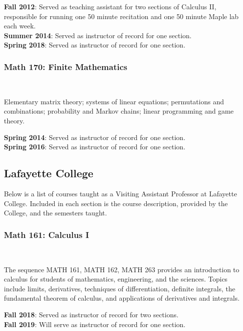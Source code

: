 \documentclass[teaching.portfolio.tex]{subfiles}
\begin{document}
\noindent
\textbf{Fall 2012}: Served as teaching assistant for two sections of Calculus II, responsible for running one 50 minute recitation and one 50 minute Maple lab each week.\\
\textbf{Summer 2014}: Served as instructor of record for one section.\\
\textbf{Spring 2018}: Served as instructor of record for one section.

\subsubsection{Math 170: Finite Mathematics}\hfill\\
\begin{tcolorbox}
  \begin{desc}
    Elementary matrix theory; systems of linear equations; permutations and combinations; probability and Markov chains; linear programming and game theory.
  \end{desc}
\end{tcolorbox}

\noindent
\textbf{Spring 2014}: Served as instructor of record for one section.\\
\textbf{Spring 2016}: Served as instructor of record for one section.

\subsection{Lafayette College}
Below is a list of courses taught as a Visiting Assistant Professor at Lafayette College.
Included in each section is the course description, provided by the College, and the semesters taught.

\subsubsection{Math 161: Calculus I}\hfill\\
\begin{tcolorbox}
  \begin{desc}
    The sequence MATH 161, MATH 162, MATH 263 provides an introduction to calculus for students of mathematics, engineering, and the sciences. Topics include limits, derivatives, techniques of differentiation, definite integrals, the fundamental theorem of calculus, and applications of derivatives and integrals. 
  \end{desc}
\end{tcolorbox}
\noindent\textbf{Fall 2018}: Served as instructor of record for two sections.\\
\noindent\textbf{Fall 2019}: Will serve as instructor of record for one section.
\end{document}
